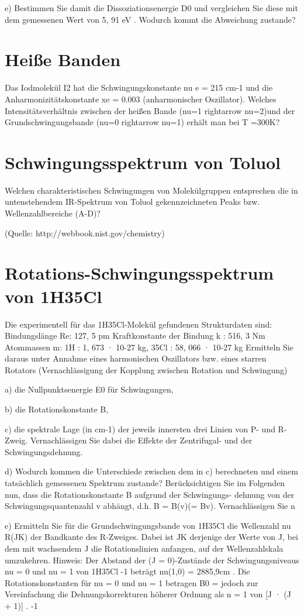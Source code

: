 e) Bestimmen Sie damit die Dissoziationsenergie D0 und vergleichen Sie diese mit dem gemessenen Wert von 5, 91 eV . Wodurch kommt die Abweichung zustande?


\section{Heiße Banden}
Das Iodmolekül I2 hat die Schwingungskonstante nu e = 215 cm-1 und die Anharmonizitätskonstante xe = 0.003 (anharmonischer Oszillator). Welches Intensitätsverhältnis zwischen der heißen Bande (nu=1 rightarrow nu=2)und der Grundschwingungsbande (nu=0 rightarrow nu=1) erhält man bei T =300K?


\section{Schwingungsspektrum von Toluol}

Welchen charakteristischen Schwingungen von Molekülgruppen entsprechen die in untenstehendem IR-Spektrum von Toluol gekennzeichneten Peaks bzw. Wellenzahlbereiche (A-D)?

(Quelle: http://webbook.nist.gov/chemistry)


\section{Rotations-Schwingungsspektrum von 1H35Cl}
 Die experimentell für das 1H35Cl-Molekül gefundenen Strukturdaten sind:
Bindungslänge Re: 127, 5 pm
Kraftkonstante der Bindung k : 516, 3 Nm
Atommassen m: 1H : 1, 673 · 10-27 kg, 35Cl : 58, 066 · 10-27 kg
Ermitteln Sie daraus unter Annahme eines harmonischen Oszillators bzw. eines starren Rotators (Vernachlässigung der Kopplung zwischen Rotation und Schwingung)

a) die Nullpunktsenergie E0 für Schwingungen,

b) die Rotationskonstante B,

c) die spektrale Lage (in cm-1) der jeweils innersten drei Linien von P- und R-Zweig. Vernachlässigen Sie dabei die Effekte der Zentrifugal- und der Schwingungsdehnung.

d) Wodurch kommen die Unterschiede zwischen dem in c) berechneten und einem tatsächlich gemessenen Spektrum zustande?
Berücksichtigen Sie im Folgenden nun, dass die Rotationskonstante B aufgrund der Schwingungs- dehnung von der Schwingungsquantenzahl v abhängt, d.h. B = B(v)(= Bv). Vernachlässigen Sie
n

e) Ermitteln Sie für die Grundschwingungsbande von 1H35Cl die Wellenzahl nu R(JK) der Bandkante des R-Zweiges. Dabei ist JK derjenige der Werte von J, bei dem mit wachsendem J die Rotationslinien anfangen, auf der Wellenzahlskala umzukehren.
Hinweis: Der Abstand der (J = 0)-Zustände der Schwingungsniveaus nu = 0 und nu = 1 von 1H35Cl
-1
beträgt nu(1,0) = 2885,9cm . Die Rotationskonstanten für nu = 0 und nu = 1 betragen B0 =
 jedoch zur Vereinfachung die Dehnungskorrekturen höherer Ordnung als n = 1 von [J · (J + 1)] .
-1




